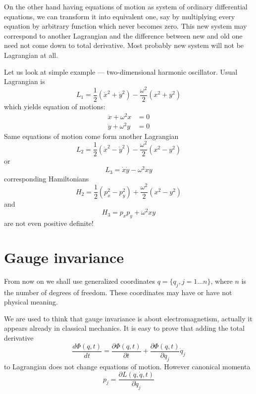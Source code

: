 On the other hand having equations of motion as system of ordinary differential equations,
we can transform it into equivalent one, say by multiplying every equation by arbitrary 
function which never becomes zero. This new system may correspond to another Lagrangian and
the difference between new and old one need not come down to total derivative. Most probably
new system will not be Lagrangian at all.

Let us look at simple example --- two-dimensional harmonic oscillator.
Usual Lagrangian is
\begin{equation}
   \label {ho1}
    L_1= \frac{1}{2} (\dot x^2+\dot y^2) -\frac{ \omega^2}{2} ( x^2+ y^2)
\end{equation}
which yields equation  of motions:
\begin{equation}
   \label {hoe1}
   \begin{split}
       \ddot x+ \omega^2 x & =0 \\
       \ddot y+ \omega^2 y & =0 
   \end{split}
\end{equation}
Same equations of motion come form 
another Lagrangian
\begin{equation}
   \label {ho2}
    L_2= \frac{1}{2} (\dot x^2-\dot y^2) -\frac{ \omega^2}{2} ( x^2- y^2)
\end{equation}
or
\begin{equation}
   \label {ho3}
    L_3= \dot x\dot y - \omega^2  x y
\end{equation}
corresponding  Hamiltonians 
\begin{equation}
   \label {ho2h}
    H_2= \frac{1}{2} ( p_x^2-p_y^2) +\frac{ \omega^2}{2} ( x^2- y^2)
\end{equation}
and
\begin{equation}
   \label {ho3h}
    H_3= p_x p_y +\omega^2  x y
\end{equation}
are not even positive definite!

\section{Gauge invariance} 
\label{gauge-invariance}

From now on we shall use generalized coordinates $ q=\{q_j, j=1\ldots n\} $, where $ n $ is the number of
degrees of freedom. These coordinates may have or have not physical meaning.

We are used to think that gauge invariance is about electromagnetism, actually it appears
already in classical mechanics. It is easy to prove that adding the total derivative
\begin{equation}
   \label {tot-der}
    \frac{d \Phi (q,t)}{d t}=\frac{\partial \Phi(q,t)}{\partial t} + \frac{ \partial \Phi (q,t)}{\partial q_j} \dot q_j
\end{equation}
to Lagrangian does not change equations of motion. However canonical momenta
\begin{equation}
   \label {can-mom}
   p_j=\frac{ \partial L(q,\dot q,t)}{\partial \dot q_j}
\end{equation}

